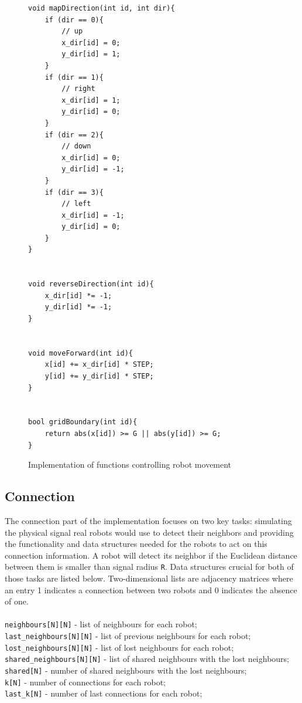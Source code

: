\begin{figure}[H]
\caption{Implementation of functions controlling robot movement}
\begin{lstlisting}[style=code]
void mapDirection(int id, int dir){
    if (dir == 0){
		// up
        x_dir[id] = 0;
        y_dir[id] = 1;
    }
    if (dir == 1){
		// right
        x_dir[id] = 1;
        y_dir[id] = 0;
    }
    if (dir == 2){
		// down
        x_dir[id] = 0;
        y_dir[id] = -1;
    }
    if (dir == 3){
		// left
        x_dir[id] = -1;
        y_dir[id] = 0;
    }
}


void reverseDirection(int id){
	x_dir[id] *= -1;
	y_dir[id] *= -1;
}


void moveForward(int id){
	x[id] += x_dir[id] * STEP;
	y[id] += y_dir[id] * STEP;
}


bool gridBoundary(int id){
    return abs(x[id]) >= G || abs(y[id]) >= G;
}
\end{lstlisting}
\label{fig:movement_implementation}
\end{figure}
\newpage

\subsection{Connection}
The connection part of the implementation focuses on two key tasks: simulating the physical signal real robots would use to detect their neighbors and providing the functionality and data structures needed for the robots to act on this connection information. A robot will detect its neighbor if the Euclidean distance between them is smaller than signal radius \texttt{R}. Data structures crucial for both of those tasks are listed below. Two-dimensional lists are adjacency matrices where an entry 1 indicates a connection between two robots and 0 indicates the absence of one. \\\\
\texttt{neighbours[N][N]} - list of neighbours for each robot;\\
\texttt{last\_neighbours[N][N]} - list of previous neighbours for each robot;\\ 
\texttt{lost\_neighbours[N][N]} - list of lost neighbours for each robot;\\
\texttt{shared\_neighbours[N][N]} - list of shared neighbours with the lost neighbours;\\
\texttt{shared[N]} - number of shared neighbours with the lost neighbours;\\
\texttt{k[N]} - number of connections for each robot;\\
\texttt{last\_k[N]} - number of last connections for each robot;\\
